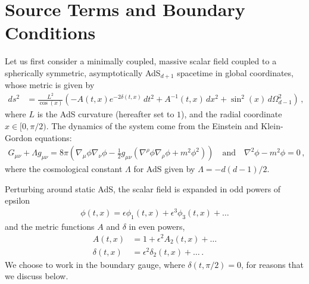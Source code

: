 \documentclass[letterpaper,11pt]{article}
\begin{document}

\section{Source Terms and Boundary Conditions}
\label{sec: source terms and BCs}

Let us first consider a minimally coupled, massive scalar field coupled to a spherically symmetric, asymptotically AdS$_{d+1}$ spacetime in global coordinates, whose metric is given by
\begin{align}
\label{AdS metric}
ds^2 &= \frac{L^2}{\cos(x)} \left( - A(t,x) e^{-2 \delta(t,x)} \, dt^2 + A^{-1}(t, x) \, dx^2 + \sin^2 (x) \, d\Omega^2_{d-1} \right) \, ,
\end{align}
where $L$ is the AdS curvature (hereafter set to $1$), and the radial coordinate $x \in [0, \pi/2)$. The dynamics of the system come from the Einstein and Klein-Gordon equations:
\begin{align}
G_{\mu \nu} + \Lambda g_{\mu \nu} = 8 \pi \left( \nabla_\mu \phi \nabla_\nu \phi - \frac{1}{2} g_{\mu \nu} \left( \nabla^\rho \phi \nabla_\rho \phi + m^2 \phi^2 \right) \right) \quad \text{and} \quad \nabla^2 \phi - m^2 \phi = 0 \, ,
\end{align}
where the cosmological constant $\Lambda$ for AdS given by $\Lambda = -d(d-1)/2$. 

Perturbing around static AdS, the scalar field is expanded in odd powers of epsilon 
\begin{align}
\phi(t,x) = \epsilon \phi_1(t,x) + \epsilon^3 \phi_3 (t,x) + \ldots
\end{align}
and the metric functions $A$ and $\delta$ in even powers,
\begin{align}
A(t, x) &= 1 + \epsilon^2 A_2 (t,x) + \ldots \\
\delta(t, x) &= \epsilon^2 \delta_2 (t,x)+ \ldots \, .
\end{align}
We choose to work in the boundary gauge, where $\delta(t, \pi/2) = 0$, for reasons that we discuss below.
\end{document}
